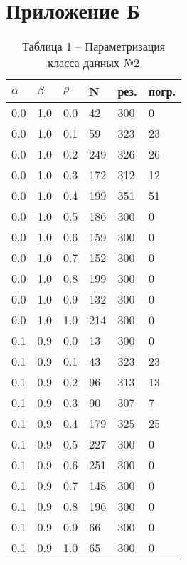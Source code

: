 \chapter*{Приложение Б}
\label{sec:fig2}

\renewcommand\thetable{} 

\begin{table}[!htb]
	\begin{minipage}{.45\linewidth}
		\caption*{Таблица 1 -- Параметризация класса данных №2}
		\centering
		\begin{tabular}{||p{}p{}p{}p{}p{}p{}||}
			\hline
			$\alpha$ & $\beta$ & $\rho$ & N & рез. & погр. \\ \hline\hline
			0.0 & 1.0 & 0.0 & 42 & 300 & 0 \\ 
			0.0 & 1.0 & 0.1 & 59 & 323 & 23 \\ 
			0.0 & 1.0 & 0.2 & 249 & 326 & 26 \\ 
			0.0 & 1.0 & 0.3 & 172 & 312 & 12 \\ 
			0.0 & 1.0 & 0.4 & 199 & 351 & 51 \\ 
			0.0 & 1.0 & 0.5 & 186 & 300 & 0 \\ 
			0.0 & 1.0 & 0.6 & 159 & 300 & 0 \\ 
			0.0 & 1.0 & 0.7 & 152 & 300 & 0 \\ 
			0.0 & 1.0 & 0.8 & 199 & 300 & 0 \\ 
			0.0 & 1.0 & 0.9 & 132 & 300 & 0 \\ 
			0.0 & 1.0 & 1.0 & 214 & 300 & 0  \\ \hline
			0.1 & 0.9 & 0.0 & 13 & 300 & 0 \\ 
			0.1 & 0.9 & 0.1 & 43 & 323 & 23 \\ 
			0.1 & 0.9 & 0.2 & 96 & 313 & 13 \\ 
			0.1 & 0.9 & 0.3 & 90 & 307 & 7 \\ 
			0.1 & 0.9 & 0.4 & 179 & 325 & 25 \\ 
			0.1 & 0.9 & 0.5 & 227 & 300 & 0 \\ 
			0.1 & 0.9 & 0.6 & 251 & 300 & 0 \\ 
			0.1 & 0.9 & 0.7 & 148 & 300 & 0 \\ 
			0.1 & 0.9 & 0.8 & 196 & 300 & 0 \\ 
			0.1 & 0.9 & 0.9 & 66 & 300 & 0 \\ 
			0.1 & 0.9 & 1.0 & 65 & 300 & 0  \\ \hline

\end{tabular}
\end{minipage}
\end{table}
